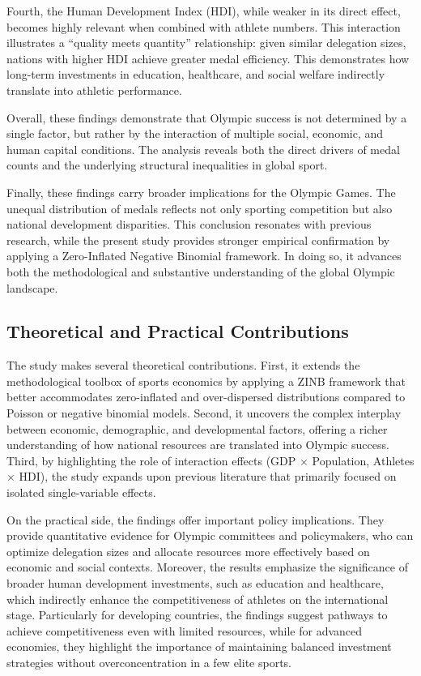 \documentclass[11pt,twoside]{article}
\numberwithin{Theorem}{section}
\numberwithin{Definition}{section}
\numberwithin{Lemma}{section}
\numberwithin{Algorithm}{section}
\numberwithin{equation}{section}
\begin{document}
Fourth, the Human Development Index (HDI), while weaker in its direct effect, becomes highly relevant when combined with athlete numbers. This interaction illustrates a “quality meets quantity” relationship: given similar delegation sizes, nations with higher HDI achieve greater medal efficiency. This demonstrates how long-term investments in education, healthcare, and social welfare indirectly translate into athletic performance.  

Overall, these findings demonstrate that Olympic success is not determined by a single factor, but rather by the interaction of multiple social, economic, and human capital conditions. The analysis reveals both the direct drivers of medal counts and the underlying structural inequalities in global sport.  

Finally, these findings carry broader implications for the Olympic Games. The unequal distribution of medals reflects not only sporting competition but also national development disparities. This conclusion resonates with previous research, while the present study provides stronger empirical confirmation by applying a Zero-Inflated Negative Binomial framework. In doing so, it advances both the methodological and substantive understanding of the global Olympic landscape.  

\subsection{Theoretical and Practical Contributions}
The study makes several theoretical contributions. First, it extends the methodological toolbox of sports economics by applying a ZINB framework that better accommodates zero-inflated and over-dispersed distributions compared to Poisson or negative binomial models. Second, it uncovers the complex interplay between economic, demographic, and developmental factors, offering a richer understanding of how national resources are translated into Olympic success. Third, by highlighting the role of interaction effects (GDP $\times$ Population, Athletes $\times$ HDI), the study expands upon previous literature that primarily focused on isolated single-variable effects.  

On the practical side, the findings offer important policy implications. They provide quantitative evidence for Olympic committees and policymakers, who can optimize delegation sizes and allocate resources more effectively based on economic and social contexts. Moreover, the results emphasize the significance of broader human development investments, such as education and healthcare, which indirectly enhance the competitiveness of athletes on the international stage. Particularly for developing countries, the findings suggest pathways to achieve competitiveness even with limited resources, while for advanced economies, they highlight the importance of maintaining balanced investment strategies without overconcentration in a few elite sports.  
\end{document}
